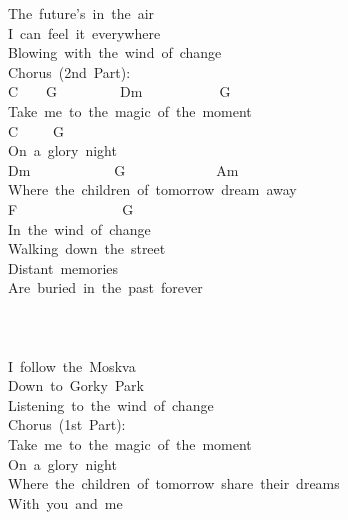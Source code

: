 \documentclass[]{book}
\begin{document}
The~future's~in~the~air\\
I~can~feel~it~everywhere\\
Blowing~with~the~wind~of~change~\\
Chorus~(2nd~Part):\\
C~~~~G~~~~~~~~~Dm~~~~~~~~~~~G\\
Take~me~to~the~magic~of~the~moment\\
\hspace*{0.333em}\hspace*{0.333em}\hspace*{0.333em}\hspace*{0.333em}\hspace*{0.333em}C~~~~~G\\
On~a~glory~night\\
\hspace*{0.333em}\hspace*{0.333em}\hspace*{0.333em}\hspace*{0.333em}\hspace*{0.333em}\hspace*{0.333em}\hspace*{0.333em}\hspace*{0.333em}\hspace*{0.333em}\hspace*{0.333em}Dm~~~~~~~~~~~~G~~~~~~~~~~~~~Am\\
Where~the~children~of~tomorrow~dream~away\\
\hspace*{0.333em}F~~~~~~~~~~~~~~~G\\
In~the~wind~of~change\\
Walking~down~the~street\\
Distant~memories\\
Are~buried~in~the~past~forever\\
~\\
~\\
~\\
I~follow~the~Moskva\\
Down~to~Gorky~Park\\
Listening~to~the~wind~of~change\\
Chorus~(1st~Part):\\
Take~me~to~the~magic~of~the~moment\\
On~a~glory~night\\
Where~the~children~of~tomorrow~share~their~dreams\\
With~you~and~me\\
~\\
\end{document}
